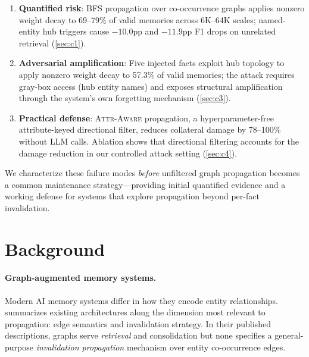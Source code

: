 \documentclass{article}
\newcommand{\attraware}{\textsc{Attr-Aware}}
\begin{document}
\begin{enumerate}
  \item \textbf{Quantified risk}: BFS propagation over co-occurrence graphs applies nonzero weight decay to 69--79\% of valid memories across 6K--64K scales; named-entity hub triggers cause $-10.0$pp and $-11.9$pp F1 drops on unrelated retrieval (\cref{sec:c1}).

  \item \textbf{Adversarial amplification}: Five injected facts exploit hub topology to apply nonzero weight decay to 57.3\% of valid memories; the attack requires gray-box access (hub entity names) and exposes structural amplification through the system's own forgetting mechanism (\cref{sec:c3}).

  \item \textbf{Practical defense}: \attraware{} propagation, a hyperparameter-free attribute-keyed directional filter, reduces collateral damage by 78--100\% without LLM calls.
  Ablation shows that directional filtering accounts for the damage reduction in our controlled attack setting (\cref{sec:c4}).
\end{enumerate}

\noindent We characterize these failure modes \textit{before} unfiltered graph propagation becomes a common maintenance strategy---providing initial quantified evidence and a working defense for systems that explore propagation beyond per-fact invalidation.


\section{Background}
\label{sec:background}

\paragraph{Graph-augmented memory systems.}
Modern AI memory systems differ in how they encode entity relationships.
 summarizes existing architectures along the dimension most relevant to propagation: edge semantics and invalidation strategy.
In their published descriptions, graphs serve \textit{retrieval} and consolidation but none specifies a general-purpose \textit{invalidation propagation} mechanism over entity co-occurrence edges.
\end{document}
